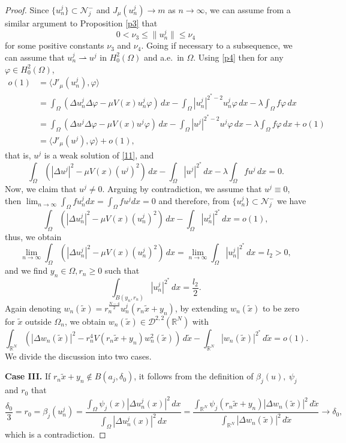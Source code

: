 \documentclass[10pt,a4paper]{amsart}
\numberwithin{equation}{section}
\begin{document}
\begin{proof}
Since \(\{u_n^j\} \subset \mathcal{N}^-_j\) and \(J_{\mu}(u_n^j)\to m\) as 
\(n\to \infty\), we can assume from a similar argument to Proposition \ref{p3} that
\[
 0<\nu_3\leq \|u_n^j\|\leq \nu_4
\]
for some positive constants $\nu_3$ and $\nu_4$. Going if necessary to a subsequence, 
we can assume that \(u_n^j\rightharpoonup u^j\) in \(H^2_0(\Omega)\) and a.e.\
in \(\Omega\). Using \eqref{p4} then for any \(\varphi \in H^2_0(\Omega)\),
\begin{align*}
 o(1)&=\langle J'_{\mu}(u_n^j), \varphi \rangle\\
 &=\int _\Omega \left( \Delta u_n^j \Delta \varphi -\mu V(x)u_n^j \varphi \right)\,dx - \int _\Omega |u_n^j|^{2^*-2}u_n^j \varphi\, dx- \lambda \int _\Omega f\varphi \,dx\\
 &=\int _\Omega \left( \Delta u^j \Delta \varphi -\mu V(x)u^j \varphi \right)\,dx - \int _\Omega |u^j|^{2^*-2}u^j \varphi \,dx- \lambda \int _\Omega f\varphi \,dx +o(1)\\
 &=\langle J'_{\mu}(u^j), \varphi \rangle+o(1),
 \end{align*}
that is, \(u^j\) is a weak solution of \eqref{11}, and
\begin{equation}\label{z1}
 \int_{\Omega}\left( |\Delta u^j|^2-\mu V(x)(u^j)^2\right)\,dx - \int_{\Omega}|u^j|^{2^*}\,dx -\lambda \int_{\Omega}fu^j \,dx=0.
\end{equation}
Now, we claim that \(u^j\neq 0\). Arguing by contradiction, we assume that 
\(u^j\equiv 0\), then \(\lim_{n\to \infty}\int _\Omega fu_n^jdx
= \int _\Omega fu^jdx=0\) and therefore, from 
\(\{u_n^j\} \subset \mathcal{N}^-_j\) we have
\[
 \int_{\Omega}\left( |\Delta u_n^j|^2-\mu V(x)(u_n^j)^2\right)\,dx -\int_{\Omega} |u_n^j|^{2^*}\,dx=o(1),
\]
thus, we obtain
 \[
 \lim_{n\to \infty}\int_{\Omega}(|\Delta u_n^j|^2-\mu V(x)(u_n^j)^2)\,dx=\lim_{n\to \infty} \int_{\Omega} |u_n^j|^{2^*}\,dx=l_2>0,
 \]
and we find \(y_n\in \Omega, r_n\geq 0\) such that
\[
 \int _{B(y_n, r_n)}|u_n^j|^{2^*}\,dx=\frac{l_2}{2}.
\]
Again denoting \(w_n(\tilde{x})=r_n^{\frac{N-4}{2}}u_n^j(r_n\tilde{x}+y_n)\), by extending \(w_n(\tilde{x})\) to be zero for \(\tilde{x}\) outside \(\Omega_n\), we obtain \(w_n(\tilde{x})\in \mathcal{D}^{2,2}(\mathbb{R}^N)\) with
 \[
 \int_{\mathbb{R}^N}\left( |\Delta w_n(\tilde{x})|^2-r_n^4 V(r_n\tilde{x}+y_n)w_n^2(\tilde{x})\right) \,d\tilde{x}-\int _{\mathbb{R}^N}|w_n(\tilde{x})|^{2^*}\,d\tilde{x}=o(1).
 \]
 We divide the discussion into two cases.
\smallskip

\noindent\textbf{Case III.} 
If \(r_n\tilde{x}+y_n \notin B(a_j, \delta_0)\), it follows from the definition of 
\(\beta_j(u), \ \psi_{j}\) and \(r_0\) that
\[
 \frac{\delta_0}{3}=r_0=\beta_j(u_n^j)=\frac{\int_{\Omega} 
 \psi_{j}(x)|\Delta u_n^j(x)|^2\,dx}{\int_{\Omega} |\Delta u_n^j(x)|^2\,dx}
 =\frac{\int_{\mathbb{R}^N} \psi_{j}(r_n\tilde{x}+y_n)|\Delta w_n(\tilde{x})|^2
 \,d\tilde{x}}{\int_{\mathbb{R}^N} |\Delta w_n(\tilde{x})|^2\,d\tilde{x}} 
 \to \delta_0,
\]
which is a contradiction.
\smallskip


\end{proof}
\end{document}
